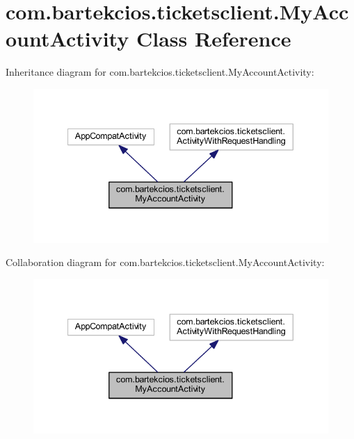 \hypertarget{classcom_1_1bartekcios_1_1ticketsclient_1_1_my_account_activity}{}\section{com.\+bartekcios.\+ticketsclient.\+My\+Account\+Activity Class Reference}
\label{classcom_1_1bartekcios_1_1ticketsclient_1_1_my_account_activity}


Inheritance diagram for com.\+bartekcios.\+ticketsclient.\+My\+Account\+Activity\+:
\nopagebreak
\begin{figure}[H]
\begin{center}
\leavevmode
\includegraphics[width=340pt]{classcom_1_1bartekcios_1_1ticketsclient_1_1_my_account_activity__inherit__graph}
\end{center}
\end{figure}


Collaboration diagram for com.\+bartekcios.\+ticketsclient.\+My\+Account\+Activity\+:
\nopagebreak
\begin{figure}[H]
\begin{center}
\leavevmode
\includegraphics[width=340pt]{classcom_1_1bartekcios_1_1ticketsclient_1_1_my_account_activity__coll__graph}
\end{center}
\end{figure}
